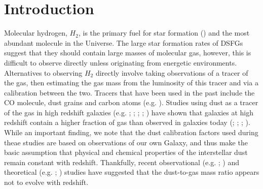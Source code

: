 \sloppy

\section{Introduction}

Molecular hydrogen, $H_2$, is the primary fuel for star formation (\citealt{Kennicutt_2012}) and the most abundant molecule in the Universe. The large star formation rates of DSFGs suggest that they should contain large masses of molecular gas, however, this is difficult to observe directly unless originating from energetic environments. Alternatives to observing $H_2$ directly involve taking observations of a tracer of the gas, then estimating the gas mass from the luminosity of this tracer and via a calibration between the two. Tracers that have been used in the past include the CO molecule, dust grains and carbon atoms (e.g. \citealt{Dunne_2022}). Studies using dust as a tracer of the gas in high redshift galaxies (e.g. \citealt{Magdis_2012}; \citealt{Eales_2012}; \citealt{Scoville_2014}; \citealt{Santini_2014}; \citealt{Genzel_2015}) have shown that galaxies at high redshift contain a higher fraction of gas than observed in galaxies today (\citealt{Tacconi_2010}; \citealt{Scoville_2016}; \citealt{Scoville_2017}; \citealt{Millard_2020}). While an important finding, we note that the dust calibration factors used during theae studies are based on observations of our own Galaxy, and thus make the basic assumption that physical and chemical properties of the interstellar dust remain constant with redshift. Thankfully, recent observational (e.g. \citealt{Shapley_2020}; \citealt{Popping_2022}) and theoretical (e.g. \citealt{Popping_2017}; \citealt{Li_2019}) studies have suggested that the dust-to-gas mass ratio appears not to evolve with redshift.

